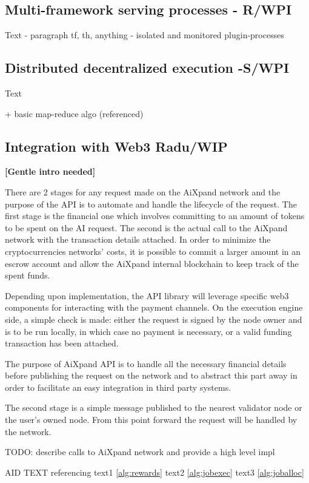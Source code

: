 \documentclass{article}
\begin{document}
\subsection{Multi-framework serving processes - R/WPI}
Text - paragraph tf, th, anything - isolated and monitored plugin-processes

\subsection{Distributed decentralized execution -S/WPI}
Text

+ basic map-reduce algo (referenced)

\subsection{Integration with Web3 Radu/WIP}

\textbf{[Gentle intro needed]}

There are 2 stages for any request made on the AiXpand network and the purpose of the API is to automate and handle the lifecycle of the request. The first stage is the financial one which involves committing to an amount of tokens to be spent on the AI request. The second is the actual call to the AiXpand network with the transaction details attached. In order to minimize the cryptocurrencies networks’ costs, it is possible to commit a larger amount in an escrow account and allow the AiXpand internal blockchain to keep track of the spent funds.

Depending upon implementation, the API library will leverage specific web3 components for interacting with the payment channels. On the execution engine side, a simple check is made: either the request is signed by the node owner and is to be run locally, in which case no payment is necessary, or a valid funding transaction has been attached.

The purpose of AiXpand API is to handle all the necessary financial details before publishing the request on the network and to abstract this part away in order to facilitate an easy integration in third party systems.

The second stage is a simple message published to the nearest validator node or the user’s owned node. From this point forward the request will be handled by the network.

TODO: describe calls to AiXpand network and provide a high level impl


AID TEXT referencing text1 \ref{alg:rewards}  text2 \ref{alg:jobexec}  text3 \ref{alg:joballoc}
\end{document}
